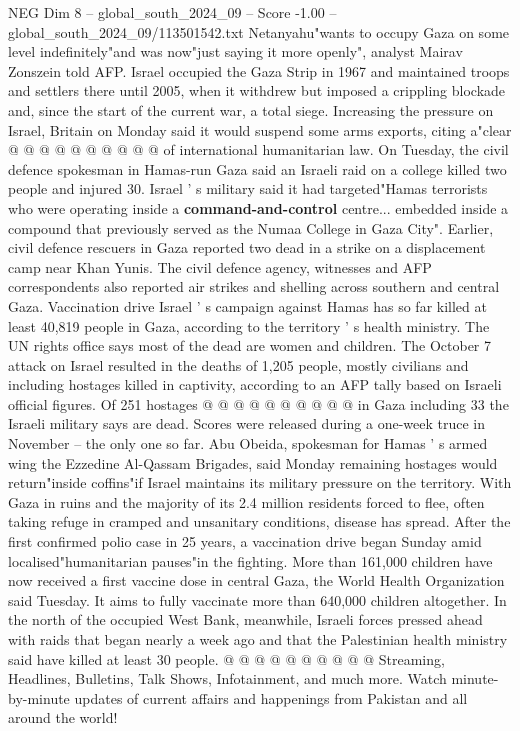 \begin{textsample}{NEG Dim 8 – global\_south\_2024\_09 – Score -1.00 – global\_south\_2024\_09/113501542.txt}
Netanyahu"wants to occupy Gaza on some level indefinitely"and was now"just saying it more openly", analyst Mairav Zonszein told AFP.
Israel occupied the Gaza Strip in 1967 and maintained troops and settlers there until 2005, when it withdrew but imposed a crippling blockade and, since the start of the current war, a total siege.
Increasing the pressure on Israel, Britain on Monday said it would suspend some arms exports, citing a"clear @ @ @ @ @ @ @ @ @ @ of international humanitarian law.
On Tuesday, the civil defence spokesman in Hamas-run Gaza said an Israeli raid on a college killed two people and injured 30.
Israel ' s military said it had targeted"Hamas terrorists who were operating inside a \textbf{command-and-control} centre... embedded inside a compound that previously served as the Numaa College in Gaza City".
Earlier, civil defence rescuers in Gaza reported two dead in a strike on a displacement camp near Khan Yunis.
The civil defence agency, witnesses and AFP correspondents also reported air strikes and shelling across southern and central Gaza.
Vaccination drive Israel ' s campaign against Hamas has so far killed at least 40,819 people in Gaza, according to the territory ' s health ministry.
The UN rights office says most of the dead are women and children.
The October 7 attack on Israel resulted in the deaths of 1,205 people, mostly civilians and including hostages killed in captivity, according to an AFP tally based on Israeli official figures.
Of 251 hostages @ @ @ @ @ @ @ @ @ @ in Gaza including 33 the Israeli military says are dead.
Scores were released during a one-week truce in November -- the only one so far.
Abu Obeida, spokesman for Hamas ' s armed wing the Ezzedine Al-Qassam Brigades, said Monday remaining hostages would return"inside coffins"if Israel maintains its military pressure on the territory.
With Gaza in ruins and the majority of its 2.4 million residents forced to flee, often taking refuge in cramped and unsanitary conditions, disease has spread.
After the first confirmed polio case in 25 years, a vaccination drive began Sunday amid localised"humanitarian pauses"in the fighting.
More than 161,000 children have now received a first vaccine dose in central Gaza, the World Health Organization said Tuesday.
It aims to fully vaccinate more than 640,000 children altogether.
In the north of the occupied West Bank, meanwhile, Israeli forces pressed ahead with raids that began nearly a week ago and that the Palestinian health ministry said have killed at least 30 people. @ @ @ @ @ @ @ @ @ @ Streaming, Headlines, Bulletins, Talk Shows, Infotainment, and much more.
Watch minute-by-minute updates of current affairs and happenings from Pakistan and all around the world!

\end{textsample}
